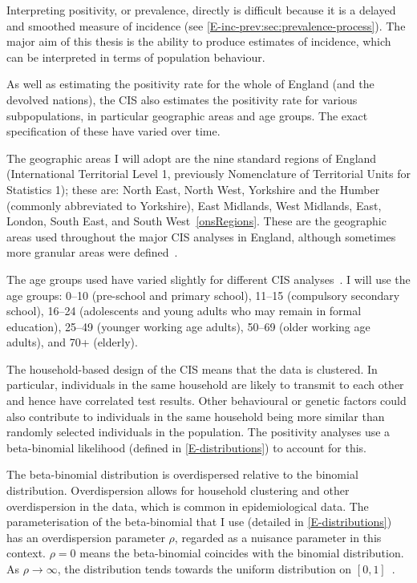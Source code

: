\documentclass[thesis.tex]{subfiles}
\begin{document}
Interpreting positivity, or prevalence, directly is difficult because it is a delayed and smoothed measure of incidence (see \cref{E-inc-prev:sec:prevalence-process}).
The major aim of this thesis is the ability to produce estimates of incidence, which can be interpreted in terms of population behaviour.

As well as estimating the positivity rate for the whole of England (and the devolved nations), the CIS also estimates the positivity rate for various subpopulations, in particular geographic areas and age groups.
The exact specification of these have varied over time.

The geographic areas I will adopt are the nine standard regions of England (International Territorial Level 1, previously Nomenclature of Territorial Units for Statistics 1); these are: North East, North West, Yorkshire and the Humber (commonly abbreviated to Yorkshire), East Midlands, West Midlands, East, London, South East, and South West~\autoref{onsRegions}.
These are the geographic areas used throughout the major CIS analyses in England, although sometimes more granular areas were defined~\autocite[e.g.][]{pouwelsMRPvaccination,pouwelsCommunity,cisMethodsONS,houseInferring,walkerTracking}.

The age groups used have varied slightly for different CIS analyses~\autocite[e.g.][]{pouwelsMRPvaccination,pouwelsCommunity,cisMethodsONS,houseInferring,walkerTracking}.
I will use the age groups: 0--10 (pre-school and primary school), 11--15 (compulsory secondary school), 16--24 (adolescents and young adults who may remain in formal education), 25--49 (younger working age adults), 50--69 (older working age adults), and 70+ (elderly).

The household-based design of the CIS means that the data is clustered.
In particular, individuals in the same household are likely to transmit to each other and hence have correlated test results.
Other behavioural or genetic factors could also contribute to individuals in the same household being more similar than randomly selected individuals in the population.
The positivity analyses use a beta-binomial likelihood (defined in \cref{E-distributions}) to account for this.

The beta-binomial distribution is overdispersed relative to the binomial distribution.
Overdispersion allows for household clustering and other overdispersion in the data, which is common in epidemiological data. 
The parameterisation of the beta-binomial that I use (detailed in \cref{E-distributions}) has an overdispersion parameter $\rho$, regarded as a nuisance parameter in this context.
$\rho=0$ means the beta-binomial coincides with the binomial distribution.
As $\rho \to \infty$, the distribution tends towards the uniform distribution on $[0, 1]$~\autocite{hughesUsing}.
\end{document}
